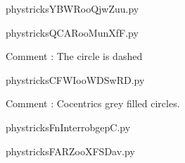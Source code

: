     

    \clearpage
    


    \newcommand{\CaptionFigYBWRooQjwZuu}{<+Type your caption here+>}
    \begin{center}
        
    \end{center}
    phystricksYBWRooQjwZuu.py

    

    \clearpage
    


    \newcommand{\CaptionFigQCARooMunXfF}{<+Type your caption here+>}
    \begin{center}
        
    \end{center}
    phystricksQCARooMunXfF.py

    Comment : The circle is dashed

    \clearpage
    


    \newcommand{\CaptionFigCFWIooWDSwRD}{<+Type your caption here+>}
    \begin{center}
        
    \end{center}
    phystricksCFWIooWDSwRD.py

    Comment : Cocentrics grey filled circles.

    \clearpage
    


    \newcommand{\CaptionFigFnInterrobgepC}{<+Type your caption here+>}
    \begin{center}
        
    \end{center}
    phystricksFnInterrobgepC.py

    

    \clearpage
    


    \newcommand{\CaptionFigFARZooXFSDav}{<+Type your caption here+>}
    \begin{center}
        
    \end{center}
    phystricksFARZooXFSDav.py

    


